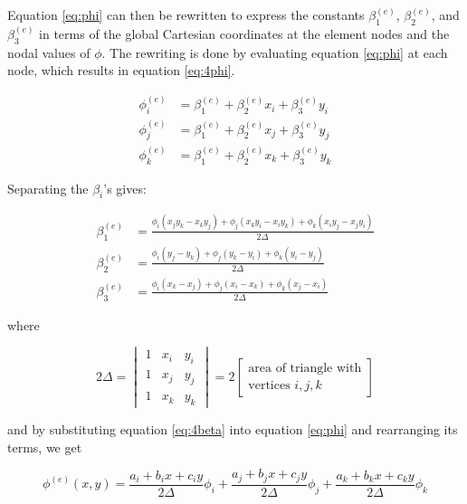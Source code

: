 Equation \eqref{eq:phi} can then be rewritten to express the constants
$\beta_1^{(e)}$, $\beta_2^{(e)}$, and $\beta_3^{(e)}$ in terms of the
global Cartesian coordinates at the element nodes and the nodal values
of $\phi$. The rewriting is done by evaluating equation \eqref{eq:phi}
at each node, which results in equation \eqref{eq:4phi}.

\begin{equation}
\label{eq:4phi}
\begin{aligned}
\phi_i^{(e)} &= \beta_1^{(e)} + \beta_2^{(e)} x_i + \beta_3^{(e)} y_i \\
\phi_j^{(e)} &= \beta_1^{(e)} + \beta_2^{(e)} x_j + \beta_3^{(e)} y_j \\
\phi_k^{(e)} &= \beta_1^{(e)} + \beta_2^{(e)} x_k + \beta_3^{(e)} y_k
\end{aligned}
\end{equation}

\layoutnewpage

Separating the $\beta_i$'s gives:

\begin{equation}
\label{eq:4beta}
\begin{aligned}
\beta_1^{(e)} &= \frac{ \phi_i(x_j y_k - x_k y_j) + \phi_j(x_k y_i -
  x_i y_k) + \phi_k(x_i y_j - x_j y_i)}{2 \Delta} \\
\beta_2^{(e)} &= \frac{\phi_i(y_j - y_k) + \phi_j(y_k - y_i) +
  \phi_k(y_i - y_j)}{2 \Delta} \\
\beta_3^{(e)} &= \frac{\phi_i(x_k - x_j) + \phi_j(x_i - x_k) +
  \phi_k(x_j - x_i)}{2 \Delta}
\end{aligned}
\end{equation}

where

\begin{equation}
\label{eq:2area-triangle}
2 \Delta = 
\begin{vmatrix}
1 & x_i & y_i \\
1 & x_j & y_j \\
1 & x_k & y_k
\end{vmatrix}
= 2
\begin{bmatrix}
\mbox{area of triangle with} \\
\mbox{vertices $i,j,k$}
\end{bmatrix}
\end{equation}

and by substituting equation \eqref{eq:4beta} into equation
\eqref{eq:phi} and rearranging its terms, we get

\begin{equation}
\label{eq:phi-functions}
\phi^{(e)}(x,y) =
\frac{a_i + b_i x + c_i y}{2 \Delta} \phi_i +
\frac{a_j + b_j x + c_j y}{2 \Delta} \phi_j +
\frac{a_k + b_k x + c_k y}{2 \Delta} \phi_k
\end{equation}

